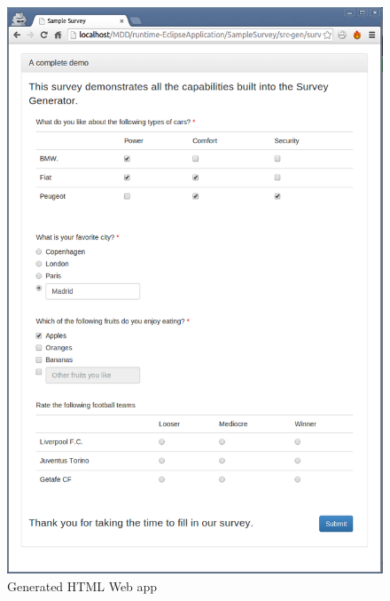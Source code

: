 \documentclass[runningheads,a4paper]{llncs}
\begin{document}
\begin{figure}[htb]
	\centering
	\includegraphics[scale=0.50]{images/html/html_survey_sample}
	\caption{Generated HTML Web app}
	\label{fig:survey_html}
\end{figure}
\end{document}
